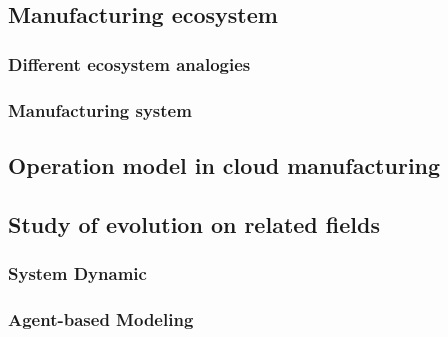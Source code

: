 
\subsection{Manufacturing ecosystem} %
\label{sub:manufacturing_ecosystem}

\subsubsection{Different ecosystem analogies}

\subsubsection{Manufacturing system}








\subsection{Operation model in cloud manufacturing}
\label{sub:Operation model in cloud manufacturing}



\subsection{Study of evolution on related fields} %
\label{sub:complex_system}
\subsubsection{System Dynamic}


\subsubsection{Agent-based Modeling}

